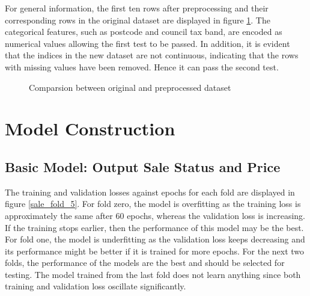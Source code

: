 \documentclass[12pt,twoside]{report}
\begin{document}
For general information, the first ten rows after preprocessing and their corresponding rows in the original dataset are displayed in figure \ref{general_info}. The categorical features, such as postcode and council tax band, are encoded as numerical values allowing the first test to be passed. In addition, it is evident that the indices in the new dataset are not continuous, indicating that the rows with missing values have been removed. Hence it can pass the second test. 

\begin{figure}[!htbp]
	\centering
	\caption{Comparsion between original and preprocessed dataset}
	\label{general_info}
\end{figure}

\section{Model Construction}

\subsection{Basic Model: Output Sale Status and Price}
The training and validation losses against epochs for each fold are displayed in figure \ref{sale_fold_5}. For fold zero, the model is overfitting as the training loss is approximately the same after 60 epochs, whereas the validation loss is increasing. If the training stops earlier, then the performance of this model may be the best. For fold one, the model is underfitting as the validation loss keeps decreasing and its performance might be better if it is trained for more epochs. For the next two folds, the performance of the models are the best and should be selected for testing. The model trained from the last fold does not learn anything since both training and validation loss oscillate significantly. 
\\
\end{document}
